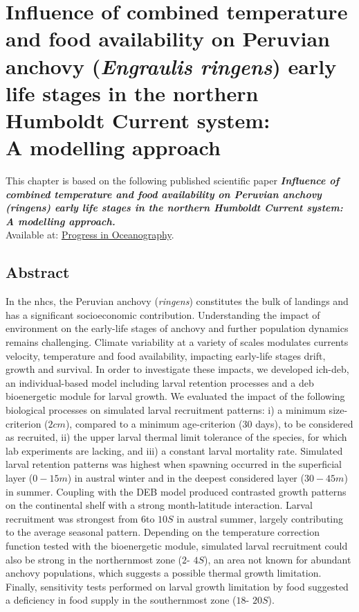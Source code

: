 \chapter{Influence of combined temperature and food availability on Peruvian anchovy (\textit{Engraulis ringens}) early life stages in the northern Humboldt Current system:\\A modelling approach}\label{Chap3}

\clearpage
This chapter is based on the following published scientific paper \citep{FlorLett2023} \textbf{\textit{Influence of combined temperature and food availability on Peruvian anchovy (\gls{ringens}) early life stages in the northern Humboldt Current system: A modelling approach.}}\\

Available at: \href{https://www.sciencedirect.com/science/article/abs/pii/S0079661123000770}{Progress in Oceanography}.

\clearpage
\section*{Abstract}

In the \acrfull{nhcs}, the Peruvian anchovy (\textit{\gls{ringens}}) constitutes the bulk of landings and has a significant socioeconomic contribution. Understanding the impact of environment on the early-life stages of anchovy and further population dynamics remains challenging. Climate variability at a variety of scales modulates currents velocity, temperature and food availability, impacting early-life stages drift, growth and survival. In order to investigate these impacts, we developed \gls{ich-deb}, an individual-based model including larval retention processes and a \acrfull{deb} bioenergetic module for larval growth. We evaluated the impact of the following biological processes on simulated larval recruitment patterns: i) a minimum size-criterion ($2 cm$), compared to a minimum age-criterion ($30$ days), to be considered as recruited, ii) the upper larval thermal limit tolerance of the species, for which lab experiments are lacking, and iii) a constant larval mortality rate. Simulated larval retention patterns was highest when spawning occurred in the superficial layer ($0 - 15 m$) in austral winter and in the deepest considered layer ($30 - 45 m$) in summer. Coupling with the DEB model produced contrasted growth patterns on the continental shelf with a strong month-latitude interaction. Larval recruitment was strongest from $6$\textdegree  to $10$\textdegree $S$ in austral summer, largely contributing to the average seasonal pattern. Depending on the temperature correction function tested with the bioenergetic module, simulated larval recruitment could also be strong in the northernmost zone ($2$\textdegree - $4$\textdegree $S$), an area not known for abundant anchovy populations, which suggests a possible thermal growth limitation. Finally, sensitivity tests performed on larval growth limitation by food suggested a deficiency in food supply in the southernmost zone ($18$\textdegree - $20$\textdegree $S$).\\

